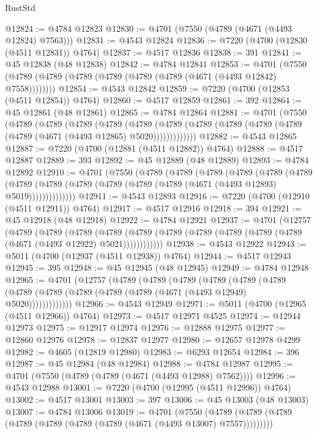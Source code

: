 \begin{lexlean}{RustStd}
\begin{coremodule}
@12824 := @4784 @12823
@12830 := @4701 (@7550 (@4789 (@4671 (@4493 @12824) @7563)))
@12831 := @4543 @12824
@12836 := @7220 (@4700 (@12830 (@4511 @12831)) @4764)
@12837 := @4517 @12836
@12838 := 391
@12841 := @45 @12838 (@48 @12838)
@12842 := @4784 @12841
@12853 := @4701 (@7550 (@4789 (@4789 (@4789 (@4789 (@4789 (@4789 (@4671 (@4493 @12842) @7558))))))))
@12854 := @4543 @12842
@12859 := @7220 (@4700 (@12853 (@4511 @12854)) @4764)
@12860 := @4517 @12859
@12861 := 392
@12864 := @45 @12861 (@48 @12861)
@12865 := @4784 @12864
@12881 := @4701
    (@7550
      (@4789
        (@4789
          (@4789
            (@4789
              (@4789
                (@4789 (@4789 (@4789 (@4789 (@4789 (@4789 (@4671 (@4493 @12865) @5020)))))))))))))
@12882 := @4543 @12865
@12887 := @7220 (@4700 (@12881 (@4511 @12882)) @4764)
@12888 := @4517 @12887
@12889 := 393
@12892 := @45 @12889 (@48 @12889)
@12893 := @4784 @12892
@12910 := @4701
    (@7550
      (@4789
        (@4789
          (@4789
            (@4789
              (@4789
                (@4789
                  (@4789
                    (@4789 (@4789 (@4789 (@4789 (@4789 (@4671 (@4493 @12893) @5019))))))))))))))
@12911 := @4543 @12893
@12916 := @7220 (@4700 (@12910 (@4511 @12911)) @4764)
@12917 := @4517 @12916
@12918 := 394
@12921 := @45 @12918 (@48 @12918)
@12922 := @4784 @12921
@12937 := @4701
    (@12757
      (@4789
        (@4789
          (@4789
            (@4789 (@4789 (@4789 (@4789 (@4789 (@4789 (@4789 (@4671 (@4493 @12922) @5021))))))))))))
@12938 := @4543 @12922
@12943 := @5011 (@4700 (@12937 (@4511 @12938)) @4764)
@12944 := @4517 @12943
@12945 := 395
@12948 := @45 @12945 (@48 @12945)
@12949 := @4784 @12948
@12965 := @4701
    (@12757
      (@4789
        (@4789
          (@4789
            (@4789
              (@4789
                (@4789 (@4789 (@4789 (@4789 (@4789 (@4789 (@4671 (@4493 @12949) @5020)))))))))))))
@12966 := @4543 @12949
@12971 := @5011 (@4700 (@12965 (@4511 @12966)) @4764)
@12973 := @4517 @12971 @4525
@12974 := @12944 @12973
@12975 := @12917 @12974
@12976 := @12888 @12975
@12977 := @12860 @12976
@12978 := @12837 @12977
@12980 := @12657 @12978 @4299
@12982 := @4605 (@12819 @12980)
@12983 := @6293 @12654
@12984 := 396
@12987 := @45 @12984 (@48 @12984)
@12988 := @4784 @12987
@12995 := @4701 (@7550 (@4789 (@4789 (@4671 (@4493 @12988) @7562))))
@12996 := @4543 @12988
@13001 := @7220 (@4700 (@12995 (@4511 @12996)) @4764)
@13002 := @4517 @13001
@13003 := 397
@13006 := @45 @13003 (@48 @13003)
@13007 := @4784 @13006
@13019 := @4701
    (@7550 (@4789 (@4789 (@4789 (@4789 (@4789 (@4789 (@4789 (@4671 (@4493 @13007) @7557)))))))))

\end{coremodule}
\end{lexlean}
